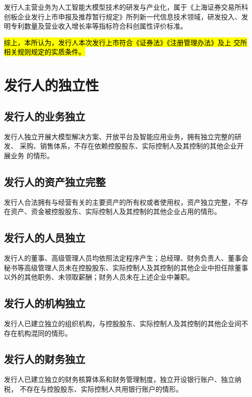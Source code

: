 \documentclass[zihao=-4]{ctexart}   %
\begin{document}
发行人主营业务为人工智能大模型技术的研发与产业化，属于《上海证券交易所科
创板企业发行上市申报及推荐暂行规定》所列新一代信息技术领域，研发投入、发
明专利数量及营业收入增长率等指标符合科创属性评价标准。

\hl{综上，本所认为，发行人本次发行上市符合《证券法》《注册管理办法》及上
交所相关规则规定的实质条件。}

\section{发行人的独立性}

\subsection{发行人的业务独立}

发行人独立开展大模型解决方案、开放平台及智能应用业务，拥有独立完整的研发、
采购、销售体系，不存在依赖控股股东、实际控制人及其控制的其他企业开展业务
的情形。

\subsection{发行人的资产独立完整}

发行人合法拥有与经营有关的主要资产的所有权或者使用权，资产独立完整，不存
在资产、资金被控股股东、实际控制人及其控制的其他企业占用的情形。

\subsection{发行人的人员独立}

发行人的董事、高级管理人员均依照法定程序产生；总经理、财务负责人、董事会
秘书等高级管理人员未在控股股东、实际控制人及其控制的其他企业中担任除董事
以外的其他职务、未领取薪酬；财务人员未在上述企业中兼职。

\subsection{发行人的机构独立}

发行人已建立独立的组织机构，与控股股东、实际控制人及其控制的其他企业间不
存在机构混同的情形。

\subsection{发行人的财务独立}

发行人已建立独立的财务核算体系和财务管理制度，独立开设银行账户、独立纳税，
不存在与控股股东、实际控制人共用银行账户的情形。
\end{document}
